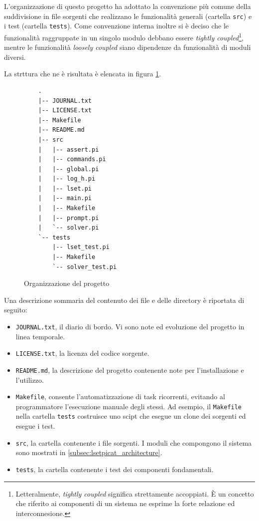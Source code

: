 \documentclass[12pt,a4paper,openright]{book} %
\begin{document}
L'organizzazione di questo progetto ha adottato la convenzione più
comune della suddivisione in file sorgenti che realizzano le
funzionalità generali (cartella \texttt{src}) e i test (cartella
\texttt{tests}). Come convenzione interna inoltre si è deciso che le
funzionalità raggruppate in un singolo modulo debbano essere
\textit{tightly coupled}\footnote{Letteralmente, \textit{tightly
    coupled} significa strettamente accoppiati. \`E un concetto che
  riferito ai componenti di un sistema ne esprime la forte relazione
  ed interconnesione.}, mentre le funzionalità \textit{loosely
  coupled} siano dipendenze da funzionalità di moduli diversi.

La strttura che ne è risultata è elencata in figura
\ref{fig:proj_folder_structure}.

\begin{figure}[]
	\label{fig:proj_folder_structure}
	\begin{verbatim}
	.
	|-- JOURNAL.txt
	|-- LICENSE.txt
	|-- Makefile
	|-- README.md
	|-- src
	|   |-- assert.pi
	|   |-- commands.pi
	|   |-- global.pi
	|   |-- log_h.pi
	|   |-- lset.pi
	|   |-- main.pi
	|   |-- Makefile
	|   |-- prompt.pi
	|   `-- solver.pi
	`-- tests
	    |-- lset_test.pi
	    |-- Makefile
	    `-- solver_test.pi
	\end{verbatim}
	\caption{Organizzazione del progetto}
\end{figure}

Una descrizione sommaria del contenuto dei file e delle directory è
riportata di seguito:
\begin{itemize}
	\item \texttt{JOURNAL.txt}, il diario di bordo. Vi sono note
          ed evoluzione del progetto in linea temporale.
	\item \texttt{LICENSE.txt}, la licenza del codice sorgente.
	\item \texttt{README.md}, la descrizione del progetto
          contenente note per l'installazione e l'utilizzo.
	\item \texttt{Makefile}, consente l'automatizzazione di task
          ricorrenti, evitando al programmatore l'esecuzione manuale
          degli stessi. Ad esempio, il \texttt{Makefile} nella
          cartella \texttt{tests} costruisce uno scipt che esegue un
          clone dei sorgenti ed esegue i test.
	\item \texttt{src}, la cartella contenente i file sorgenti. I
          moduli che compongono il sistema sono mostrati in
          \ref{subsec:lsetpicat_architecture}.
	\item \texttt{tests}, la cartella contenente i test dei
          componenti fondamentali.
\end{itemize}
\end{document}
